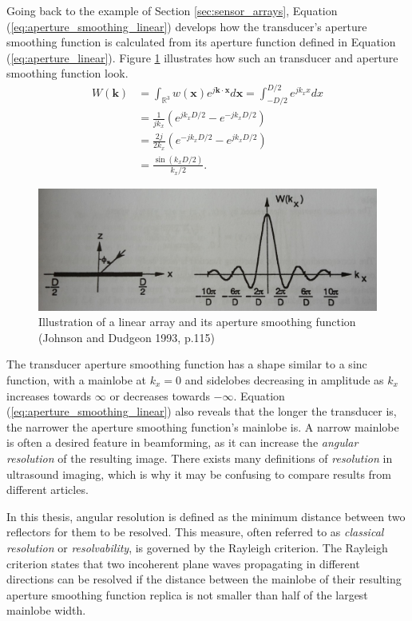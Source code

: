 Going back to the example of Section \ref{sec:sensor_arrays}, Equation (\ref{eq:aperture_smoothing_linear}) develops how the transducer's aperture smoothing function is calculated from its aperture function defined in Equation (\ref{eq:aperture_linear}). Figure \ref{fig:linarray} illustrates how such an transducer and aperture smoothing function look.
\begin{align}
    W(\boldsymbol{k}) &= \int_{\mathbb{R}^3} w(\boldsymbol{x}) e^{j \boldsymbol{k} \cdot \boldsymbol{x}} d\boldsymbol{x} = \int_{-D/2}^{D/2} e^{j k_x x} dx \nonumber \\
    &= \frac{1}{j k_x} (e^{j k_x D/2} - e^{-j k_x D/2}) \nonumber \\
    &= \frac{2j}{2k_x} (e^{-j k_x D/2} - e^{j k_x D/2}) \nonumber \\
    &= \frac{\sin(k_x D/2)}{k_x/2}.
\label{eq:aperture_smoothing_linear}
\end{align}

\begin{figure}[ht]
    \includegraphics[width=\linewidth]{./images/background/linarray.jpg}
	\caption{Illustration of a linear array and its aperture smoothing function (Johnson and Dudgeon 1993, p.115)}
	\label{fig:linarray}
\end{figure}
\noindent
The transducer aperture smoothing function has a shape similar to a sinc function, with a mainlobe at $k_x = 0$ and sidelobes decreasing in amplitude as $k_x$ increases towards $\infty$ or decreases towards $-\infty$. Equation (\ref{eq:aperture_smoothing_linear}) also reveals that the longer the transducer is, the narrower the aperture smoothing function's mainlobe is. A narrow mainlobe is often a desired feature in beamforming, as it can increase the \textit{angular resolution} of the resulting image. There exists many definitions of \textit{resolution} in ultrasound imaging, which is why it may be confusing to compare results from different articles.

In this thesis, angular resolution is defined as the minimum distance between two reflectors for them to be resolved. This measure, often referred to as \textit{classical resolution} or \textit{resolvability}, is governed by the Rayleigh criterion. The Rayleigh criterion states that two incoherent plane waves propagating in different directions can be resolved if the distance between the mainlobe of their resulting aperture smoothing function replica is not smaller than half of the largest mainlobe width.

